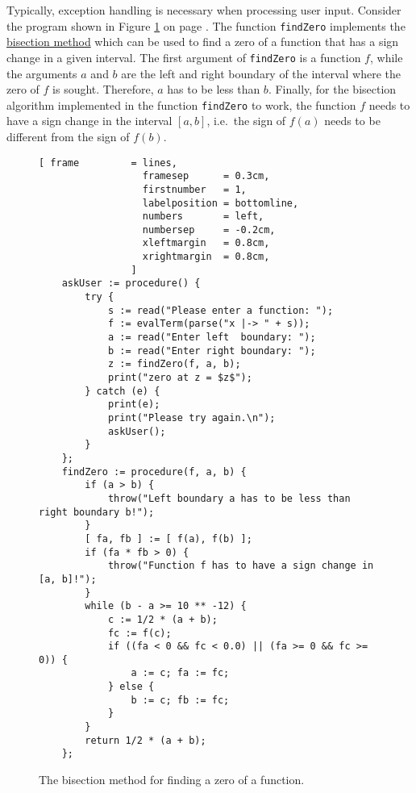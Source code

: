 Typically, exception handling is necessary when  processing user input.  Consider the program
shown in Figure \ref{fig:bisection-exception.stlx} on page \pageref{fig:bisection-exception.stlx}.
The function \texttt{findZero} implements 
the \href{https://en.wikipedia.org/wiki/Bisection_method}{bisection method} which can be used to
find a zero of a function that has a sign change in a given interval.  The first argument of 
\texttt{findZero} is a function $f$, while the arguments $a$ and $b$ are the left and right
boundary of the interval where the zero of $f$ is sought.  Therefore, $a$ has to be less than
$b$.  Finally, for the bisection algorithm implemented in the function \texttt{findZero} to
work, the function $f$ needs to have a sign change in the interval $[a,b]$, i.e.~the sign of $f(a)$
needs to be different from the sign of $f(b)$.  

\begin{figure}[!ht]
\centering
\begin{Verbatim}[ frame         = lines, 
                  framesep      = 0.3cm, 
                  firstnumber   = 1,
                  labelposition = bottomline,
                  numbers       = left,
                  numbersep     = -0.2cm,
                  xleftmargin   = 0.8cm,
                  xrightmargin  = 0.8cm,
                ]
    askUser := procedure() {
        try {
            s := read("Please enter a function: ");
            f := evalTerm(parse("x |-> " + s));
            a := read("Enter left  boundary: ");
            b := read("Enter right boundary: ");
            z := findZero(f, a, b);
            print("zero at z = $z$");
        } catch (e) {
            print(e);
            print("Please try again.\n");
            askUser();
        }
    };
    findZero := procedure(f, a, b) {
        if (a > b) {
            throw("Left boundary a has to be less than right boundary b!");   
        }
        [ fa, fb ] := [ f(a), f(b) ]; 
        if (fa * fb > 0) {
            throw("Function f has to have a sign change in [a, b]!");
        }
        while (b - a >= 10 ** -12) {
            c := 1/2 * (a + b);
            fc := f(c); 
            if ((fa < 0 && fc < 0.0) || (fa >= 0 && fc >= 0)) {
                a := c; fa := fc; 
            } else {
                b := c; fb := fc; 
            }
        }
        return 1/2 * (a + b);
    };
\end{Verbatim}
\vspace*{-0.3cm}
\caption{The bisection method for finding a zero of a function.}
\label{fig:bisection-exception.stlx}
\end{figure}

